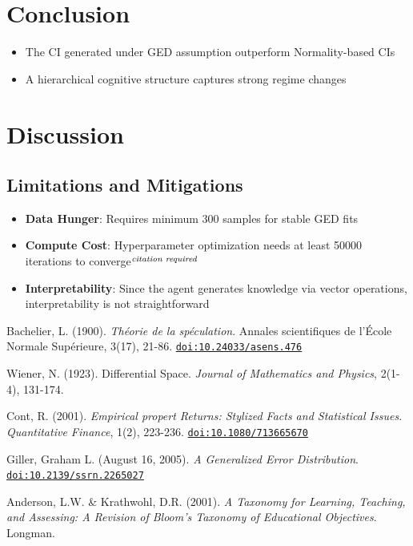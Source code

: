 \documentclass[12pt]{article}
\begin{document}
\section{Conclusion}
\label{sec:conclusions}

\begin{itemize}
    \item The CI generated under GED assumption outperform Normality-based CIs
    \item A hierarchical cognitive structure captures strong regime changes
\end{itemize}

\section{Discussion}
\label{sec:discussion}

\subsection{Limitations and Mitigations}
\begin{itemize}
\item \textbf{Data Hunger}: Requires minimum 300 samples for stable GED fits
\item \textbf{Compute Cost}: Hyperparameter optimization needs at least 50000 iterations to converge$^{\emph{citation required}}$
\item \textbf{Interpretability}: Since the agent generates knowledge via vector operations, interpretability is not straightforward
\end{itemize}

\label{sec:references}

\begin{thebibliography}{9}

Bachelier, L. (1900). \textit{Théorie de la spéculation}. Annales scientifiques de l'École Normale Supérieure, 3(17), 21-86.
\href{https://doi.org/10.24033/asens.476}{\texttt{doi:10.24033/asens.476}}

Wiener, N. (1923). Differential Space. \textit{Journal of Mathematics and Physics}, 2(1-4), 131-174.

Cont, R. (2001). \textit{Empirical propert Returns: Stylized Facts and Statistical Issues. Quantitative Finance}, 1(2), 223-236.
\href{https://doi.org/10.1080/713665670}{\texttt{doi:10.1080/713665670}}

Giller, Graham L. (August 16, 2005).  \textit{A Generalized Error Distribution}.
\href{https://doi.org/10.2139/ssrn.2265027}{\texttt{doi:10.2139/ssrn.2265027}}

Anderson, L.W. \& Krathwohl, D.R. (2001). \textit{A Taxonomy for Learning, Teaching, and Assessing: A Revision of Bloom's Taxonomy of Educational Objectives}. Longman.

\end{thebibliography}
\end{document}
